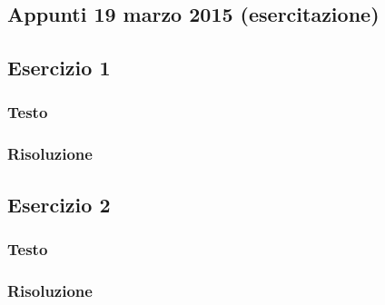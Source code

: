 \documentclass[portait]{article}
\begin{document}
\begin{enumerate}
\section{Appunti 19 marzo 2015 (esercitazione)}
\subsection{Esercizio 1}
\subsubsection{Testo}
\subsubsection{Risoluzione}
\subsection{Esercizio 2}
\subsubsection{Testo}
\subsubsection{Risoluzione}
\end{enumerate}
\end{document}
